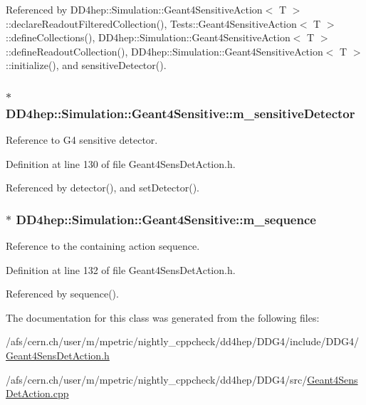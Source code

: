 Referenced by DD4hep::Simulation::Geant4SensitiveAction$<$ T $>$::declareReadoutFilteredCollection(), Tests::Geant4SensitiveAction$<$ T $>$::defineCollections(), DD4hep::Simulation::Geant4SensitiveAction$<$ T $>$::defineReadoutCollection(), DD4hep::Simulation::Geant4SensitiveAction$<$ T $>$::initialize(), and sensitiveDetector().\hypertarget{class_d_d4hep_1_1_simulation_1_1_geant4_sensitive_afc56b9a8666f9fe594516436f7fdd4e0}{
\subsubsection[{m\_\-sensitiveDetector}]{$\ast$ {\bf DD4hep::Simulation::Geant4Sensitive::m\_\-sensitiveDetector}}}
\label{class_d_d4hep_1_1_simulation_1_1_geant4_sensitive_afc56b9a8666f9fe594516436f7fdd4e0}


Reference to G4 sensitive detector. 

Definition at line 130 of file Geant4SensDetAction.h.

Referenced by detector(), and setDetector().\hypertarget{class_d_d4hep_1_1_simulation_1_1_geant4_sensitive_a7c98977dbb602b8053f21ff8e36f925d}{
\subsubsection[{m\_\-sequence}]{$\ast$ {\bf DD4hep::Simulation::Geant4Sensitive::m\_\-sequence}}}
\label{class_d_d4hep_1_1_simulation_1_1_geant4_sensitive_a7c98977dbb602b8053f21ff8e36f925d}


Reference to the containing action sequence. 

Definition at line 132 of file Geant4SensDetAction.h.

Referenced by sequence().

The documentation for this class was generated from the following files:\begin{DoxyCompactItemize}
\item 
/afs/cern.ch/user/m/mpetric/nightly\_\-cppcheck/dd4hep/DDG4/include/DDG4/\hyperlink{_geant4_sens_det_action_8h}{Geant4SensDetAction.h}\item 
/afs/cern.ch/user/m/mpetric/nightly\_\-cppcheck/dd4hep/DDG4/src/\hyperlink{_geant4_sens_det_action_8cpp}{Geant4SensDetAction.cpp}\end{DoxyCompactItemize}
